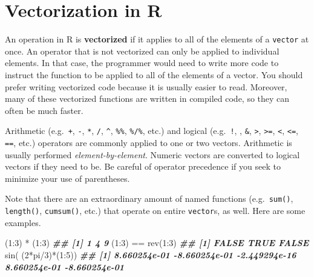\documentclass[
  12pt,
]{krantz}
\makeatletter
\newenvironment{Shaded}{\begin{snugshade}}{\end{snugshade}}
\newcommand{\DecValTok}[1]{\textcolor[rgb]{0.06,0.06,0.06}{#1}}
\newcommand{\DocumentationTok}[1]{\textcolor[rgb]{0.37,0.37,0.37}{\textbf{\textit{#1}}}}
\newcommand{\FunctionTok}[1]{\textcolor[rgb]{0,0,0}{#1}}
\newcommand{\NormalTok}[1]{#1}
\newcommand{\SpecialCharTok}[1]{\textcolor[rgb]{0,0,0}{#1}}
\newenvironment{kframe}{%
\medskip{}
\setlength{\fboxsep}{.8em}
 \def\at@end@of@kframe{}%
 \ifinner\ifhmode%
  \def\at@end@of@kframe{\end{minipage}}%
  \begin{minipage}{\columnwidth}%
 \fi\fi%
 \def\FrameCommand##1{\hskip\@totalleftmargin \hskip-\fboxsep
 \colorbox{shadecolor}{##1}\hskip-\fboxsep
     \hskip-\linewidth \hskip-\@totalleftmargin \hskip\columnwidth}%
 \MakeFramed {\advance\hsize-\width
   \@totalleftmargin\z@ \linewidth\hsize
   \@setminipage}}%
 {\par\unskip\endMakeFramed%
 \at@end@of@kframe}
\renewenvironment{Shaded}{\begin{kframe}}{\end{kframe}}
\makeatother
\begin{document}
\hypertarget{vectorization-in-r}{%
\section{Vectorization in R}\label{vectorization-in-r}}

An operation in R is \textbf{vectorized} if it applies to all of the elements of a \texttt{vector} at once. An operator that is not vectorized can only be applied to individual elements. In that case, the programmer would need to write more code to instruct the function to be applied to all of the elements of a vector. You should prefer writing vectorized code because it is usually easier to read. Moreover, many of these vectorized functions are written in compiled code, so they can often be much faster.

Arithmetic (e.g.~\texttt{+}, \texttt{-}, \texttt{*}, \texttt{/}, \texttt{\^{}}, \texttt{\%\%}, \texttt{\%/\%}, etc.) and logical (e.g.~\texttt{!}, \texttt{\textbar{}}, \texttt{\&}, \texttt{\textgreater{}}, \texttt{\textgreater{}=}, \texttt{\textless{}}, \texttt{\textless{}=}, \texttt{==}, etc.) operators are commonly applied to one or two vectors. Arithmetic is usually performed \emph{element-by-element}. Numeric vectors are converted to logical vectors if they need to be. Be careful of operator precedence if you seek to minimize your use of parentheses.

Note that there are an extraordinary amount of named functions (e.g.~\texttt{sum()}, \texttt{length()}, \texttt{cumsum()}, etc.) that operate on entire \texttt{vector}s, as well. Here are some examples.

\begin{Shaded}
\begin{Highlighting}[]
\NormalTok{(}\DecValTok{1}\SpecialCharTok{:}\DecValTok{3}\NormalTok{) }\SpecialCharTok{*}\NormalTok{ (}\DecValTok{1}\SpecialCharTok{:}\DecValTok{3}\NormalTok{)        }
\DocumentationTok{\#\# [1] 1 4 9}
\NormalTok{(}\DecValTok{1}\SpecialCharTok{:}\DecValTok{3}\NormalTok{) }\SpecialCharTok{==} \FunctionTok{rev}\NormalTok{(}\DecValTok{1}\SpecialCharTok{:}\DecValTok{3}\NormalTok{)    }
\DocumentationTok{\#\# [1] FALSE  TRUE FALSE}
\FunctionTok{sin}\NormalTok{( (}\DecValTok{2}\SpecialCharTok{*}\NormalTok{pi}\SpecialCharTok{/}\DecValTok{3}\NormalTok{)}\SpecialCharTok{*}\NormalTok{(}\DecValTok{1}\SpecialCharTok{:}\DecValTok{5}\NormalTok{)) }
\DocumentationTok{\#\# [1]  8.660254e{-}01 {-}8.660254e{-}01 {-}2.449294e{-}16  8.660254e{-}01 {-}8.660254e{-}01}
\end{Highlighting}
\end{Shaded}
\end{document}
